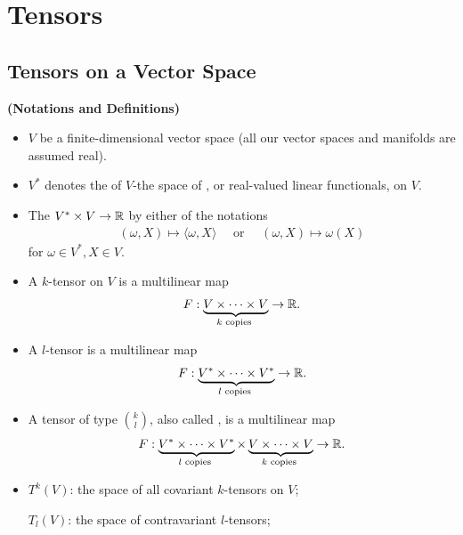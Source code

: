 \documentclass[12pt]{article} %
\newcommand{\bfs}[1]{\textbf{({#1}) }}
\begin{document}
\section{Tensors}
\subsection{Tensors on a Vector Space}
\begin{defa}\bfs{Notations and Definitions}
\begin{itemize}
    \item $V$ be a finite-dimensional vector space (all our vector spaces and manifolds are assumed real). 
    \item $V^{*}$ denotes the  of $V$-the space of , or real-valued linear functionals, on $V$.
    \item The  $V^{*} \times V \rightarrow \mathbb{R}$ by either of the notations
\begin{align*}
(\omega, X) \mapsto\langle\omega, X\rangle \quad \text { or } \quad(\omega, X) \mapsto \omega(X)
\end{align*}for $\omega \in V^{*}, X \in V$.
\item A  $k$-tensor on $V$ is a multilinear map
\begin{align*}
F: \underbrace{V \times \cdots \times V}_{k \text { copies }} \rightarrow\mathbb{R} .
\end{align*}
\item A  $l$-tensor is a multilinear map
\begin{align*}
F: \underbrace{V^{*} \times \cdots \times V^{*}}_{l \text { copies }} \rightarrow\mathbb{R} .
\end{align*}
\item  A tensor of type $\binom{k}{l}$, also called , is a multilinear map
\begin{align*}
F: \underbrace{V^{*} \times \cdots \times V^{*}}_{l \text { copies }} \times \underbrace{V \times \cdots \times V}_{k \text { copies }} \rightarrow\mathbb{R} .
\end{align*}
\item $T^{k}(V)$: the space of all covariant $k$-tensors on $V$;

 $T_{l}(V)$: the space of contravariant $l$-tensors; 


\end{itemize}
\end{defa}
\end{document}
